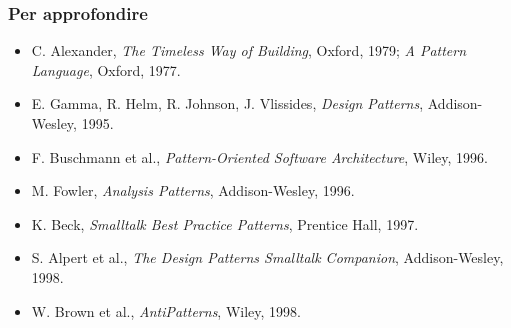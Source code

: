 
\subsubsection*{Per approfondire}

\begin{itemize}
  \item C. Alexander, \textit{The Timeless Way of Building}, Oxford, 1979; \textit{A Pattern Language}, Oxford, 1977.
  \item E. Gamma, R. Helm, R. Johnson, J. Vlissides, \textit{Design Patterns}, Addison-Wesley, 1995.
  \item F. Buschmann et al., \textit{Pattern-Oriented Software Architecture}, Wiley, 1996.
  \item M. Fowler, \textit{Analysis Patterns}, Addison-Wesley, 1996.
  \item K. Beck, \textit{Smalltalk Best Practice Patterns}, Prentice Hall, 1997.
  \item S. Alpert et al., \textit{The Design Patterns Smalltalk Companion}, Addison-Wesley, 1998.
  \item W. Brown et al., \textit{AntiPatterns}, Wiley, 1998.
\end{itemize}

